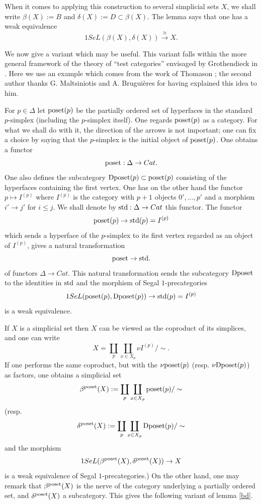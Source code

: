 When it comes to applying this construction to several simplicial
sets $X$, we shall write $\beta (X):= B$ and $\delta (X):= D\subset \beta (X)$.
The lemma says that one has a weak equivalence
$$
1SeL(\beta (X), \delta (X))\stackrel{\cong}{\rightarrow} X.
$$

We now give a variant which may be useful. This
variant falls within the
more general framework of the theory of ``test categories'' envisaged by
Grothendieck in \cite{Grothendieck}. Here we use an example which comes
from the work of Thomason \cite{ThomasonLimits} \cite{ThomasonCatMod}; the
second author thanks G. Maltsiniotis and A. Bruguières for having
explained this idea to him.


For $p\in \Delta$ let ${\rm poset}(p)$
be the partially ordered set of hyperfaces in the standard $p$-simplex
(including the $p$-simplex itself). One regards ${\rm poset}(p)$ as a
category. For what we shall do with it, the direction of the arrows is not
important; one can fix a choice by saying that the $p$-simplex is the initial
object of ${\rm poset}(p)$. One obtains a functor
$$
{\rm poset}: \Delta \rightarrow Cat.
$$
One also defines the subcategory ${\rm Dposet} (p)\subset
{\rm poset}(p)$ consisting of the hyperfaces containing the first vertex. One
has on the other hand the functor $p\mapsto I^{(p)}$ where $I^{(p)}$ is the
category with $p+1$ objects $0',\ldots , p'$ and a morphism $i'\rightarrow j'$
for $i\leq j$. We shall denote by ${\rm std}: \Delta \rightarrow Cat$ this
functor.
The functor
$$
{\rm poset}(p)\rightarrow {\rm std}(p)= I^{(p)}
$$
which sends
a hyperface of the $p$-simplex to its first vertex regarded
as an object of $I^{(p)}$, gives a natural transformation
$$
{\rm poset} \rightarrow {\rm std}.
$$
of functors $\Delta
\rightarrow Cat$.
This natural transformation sends the subcategory $ {\rm Dposet}$
to the identities in ${\rm std}$ and the morphism of Segal $1$-precategories
$$
1SeL({\rm poset}(p), {\rm Dposet}(p) )\rightarrow {\rm std}(p)=I^{(p)}
$$
is a weak equivalence.

If $X$ is a simplicial set then $X$ can be viewed as the coproduct
of its simplices, and one can write
$$
X= \coprod _p\coprod _{x\in X_p}\nu I^{(p)} /\sim .
$$
If one performs the same coproduct, but with the $\nu {\rm poset}(p)$
(resp. $\nu {\rm Dposet}(p)$) as
factors, one obtains a simplicial set
$$
\beta ^{\rm poset} (X):= \coprod _p \coprod _{x\in X_p}{\rm poset}(p) /\sim
$$
(resp.
$$
\delta ^{\rm poset} (X):= \coprod _p \coprod _{x\in X_p} {\rm Dposet}(p)
/\sim
$$
and the morphism
$$
1SeL(\beta ^{\rm poset} (X), \delta ^{\rm poset} (X))\rightarrow
X
$$
is a weak equivalence of Segal $1$-precategories.)
On the other hand, one may
remark that $\beta ^{\rm poset} (X)$ is the nerve of the category
underlying a partially ordered set, and
$\delta ^{\rm poset} (X)$ a subcategory. This gives the following variant
of lemma \ref{bd}.

